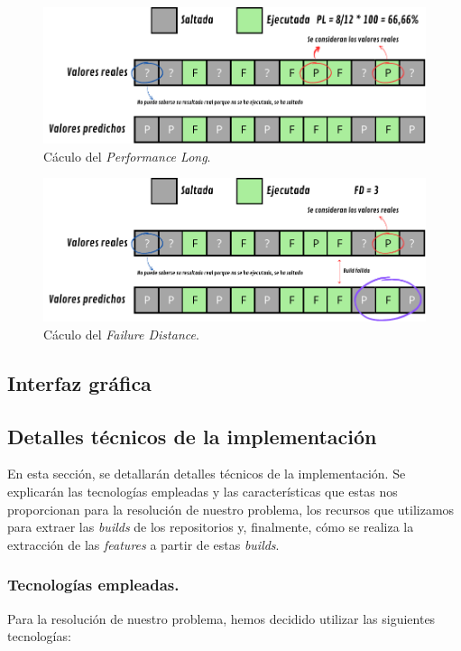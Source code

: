 \begin{figure}[H]
    \centering
    \includegraphics[scale=0.9]{images/PL.pdf}
    \caption{Cáculo del \textit{Performance Long}.}
    \label{fig:PL}
\end{figure}

\begin{figure}[H]
    \centering
    \includegraphics[scale=0.9]{images/FD.pdf}
    \caption{Cáculo del \textit{Failure Distance}.}
    \label{fig:FD}
\end{figure}

\subsection{Interfaz gráfica}


\subsection{Detalles técnicos de la implementación}
En esta sección, se detallarán detalles técnicos de la implementación. Se explicarán las
tecnologías empleadas y las características que estas nos proporcionan para la resolución
de nuestro problema, los recursos que utilizamos para extraer las \textit{builds} de los
repositorios y, finalmente, cómo se realiza la extracción de las \textit{features} a partir de
estas \textit{builds}.

\subsubsection{Tecnologías empleadas.}
Para la resolución de nuestro problema, hemos decidido utilizar las siguientes tecnologías:

